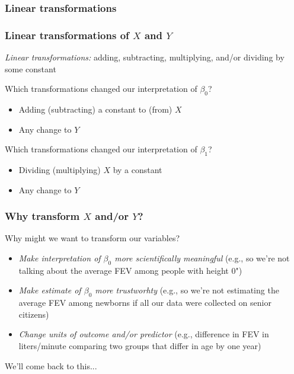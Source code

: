 \documentclass[12pt, 
hyperref={colorlinks=true, linkcolor=blue, urlcolor=cyan},dvipsnames]{beamer}
\begin{document}
\subsubsection{Linear transformations}
\begin{frame}
\frametitle{Linear transformations of $X$ and $Y$}

\textit{Linear transformations:} adding, subtracting, multiplying, and/or dividing by some constant

Which transformations changed our interpretation of $\beta_0$?\vspace{-0.3cm}\pause
\begin{itemize}
\item[] Adding (subtracting) a constant to (from) $X$
\item[] Any change to $Y$\pause
\end{itemize}

Which transformations changed our interpretation of $\beta_1$?\pause
\vspace{-0.3cm}
\begin{itemize}
\item[] Dividing (multiplying) $X$ by a constant  
\item[] Any change to $Y$
\end{itemize}
\end{frame}

\begin{frame}
\frametitle{Why transform $X$ and/or $Y$?}
Why might we want to transform our variables? 
\begin{itemize}
\item \textit{Make interpretation of $\beta_0$ more scientifically meaningful} (e.g., so we're not talking about the average FEV among people with height 0")
\item \textit{Make estimate of $\beta_0$ more trustworhty} (e.g., so we're not estimating the average FEV among newborns if all our data were collected on senior citizens)
\item \textit{Change units of outcome and/or predictor} (e.g., difference in FEV in liters/minute comparing two groups that differ in age by one year)
\end{itemize}

We'll come back to this...
\end{frame}
\end{document}
